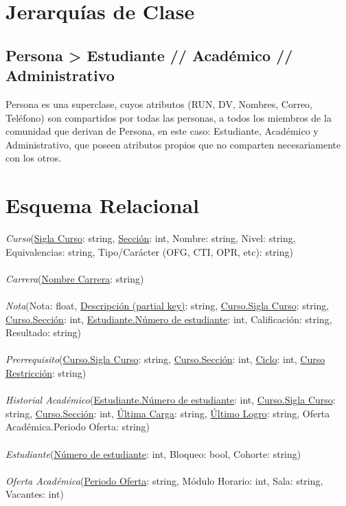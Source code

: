 \documentclass[12pt]{article}
\begin{document}
\section*{Jerarquías de Clase}
\subsection*{Persona \textgreater \; Estudiante // Académico // Administrativo}
Persona es una superclase, cuyos atributos (RUN, DV, Nombres, Correo, Teléfono) son compartidos por todas las personas, a todos los miembros de la comunidad que derivan de Persona, en este caso: Estudiante, Académico y Administrativo, que poseen atributos propios que no comparten necesariamente con los otros. 
\section*{Esquema Relacional}
\textit{Curso}(\underline{Sigla Curso}: string, \underline{Sección}: int, Nombre: string, Nivel: string, Equivalencias: string, Tipo/Carácter (OFG, CTI, OPR, etc): string)\\\\
\textit{Carrera}(\underline{Nombre Carrera}: string)\\\\
\textit{Nota}(Nota: float, \underline{Descripción (partial key)}: string, \underline{Curso.Sigla Curso}: string, \underline{Curso.Sección}: int, \underline{Estudiante.Número de estudiante}: int,
Calificación: string, Resultado: string)\\\\
\textit{Prerrequisito}(\underline{Curso.Sigla Curso}: string, \underline{Curso.Sección}: int, \underline{Ciclo}: int, \underline{Curso Restricción}: string)\\\\
\textit{Historial Académico}(\underline{Estudiante.Número de estudiante}: int, \underline{Curso.Sigla Curso}: string, \underline{Curso.Sección}: int, \underline{Última Carga}: string, \underline{Último Logro}: string, Oferta Académica.Periodo Oferta: string)\\\\
\textit{Estudiante}(\underline{Número de estudiante}: int, Bloqueo: bool, Cohorte: string)\\\\
\textit{Oferta Académica}(\underline{Periodo Oferta}: string, Módulo Horario: int, Sala: string, Vacantes: int)\\\\
\end{document}
